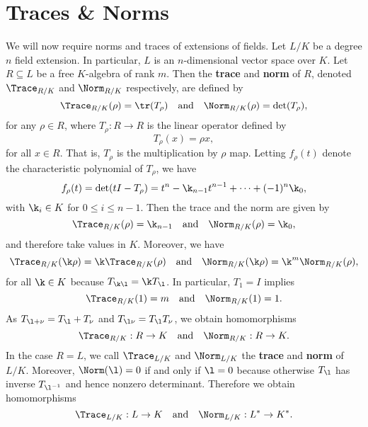   \section{Traces \& Norms}
    We will now require norms and traces of extensions of fields. Let $L/K$ be a degree $n$ field extension. In particular, $L$ is an $n$-dimensional vector space over $K$. Let $R \subseteq L$ be a free $K$-algebra of rank $m$. Then the \textbf{trace} and \textbf{norm} of $R$, denoted $\Trace_{R/K}$ and $\Norm_{R/K}$ respectively, are defined by
    \[
      \Trace_{R/K}(\rho) = \tr(T_{\rho}) \quad \text{and} \quad \Norm_{R/K}(\rho) = \det(T_{\rho}),
    \]
    for any $\rho \in R$, where $T_{\rho}:R \to R$ is the linear operator defined by
    \[
      T_{\rho}(x) = \rho x,
    \]
    for all $x \in R$. That is, $T_{\rho}$ is the multiplication by $\rho$ map. Letting $f_{\rho}(t)$ denote the characteristic polynomial of $T_{\rho}$, we have
    \[
      f_{\rho}(t) = \det(tI-T_{\rho}) = t^{n}-\k_{n-1}t^{n-1}+\cdots+(-1)^{n}\k_{0},
    \]
    with $\k_{i} \in K$ for $0 \le i \le n-1$. Then the trace and the norm are given by
    \begin{equation}\label{equ:trace_and_norm_characteristic_polynomial}
      \Trace_{R/K}(\rho) = \k_{n-1} \quad \text{and} \quad \Norm_{R/K}(\rho) = \k_{0},
    \end{equation}
    and therefore take values in $K$. Moreover, we have
    \[
      \Trace_{R/K}(\k\rho) = \k\Trace_{R/K}(\rho) \quad \text{and} \quad \Norm_{R/K}(\k\rho) = \k^{m}\Norm_{R/K}(\rho),
    \]
    for all $\k \in K$ because $T_{\k\l} = \k T_{\l}$. In particular, $T_{1} = I$ implies
    \[
      \Trace_{R/K}(1) = m \quad \text{and} \quad \Norm_{R/K}(1) = 1.
    \]
    As $T_{\l+\nu} = T_{\l}+T_{\nu}$ and $T_{\l \nu} = T_{\l}T_{\nu}$, we obtain homomorphisms
    \[
      \Trace_{R/K}:R \to K \quad \text{and} \quad \Norm_{R/K}:R \to K.
    \]
    In the case $R = L$, we call $\Trace_{L/K}$ and $\Norm_{L/K}$ the \textbf{trace} and \textbf{norm} of $L/K$. Moreover, $\Norm(\l) = 0$ if and only if $\l = 0$ because otherwise $T_{\l}$ has inverse $T_{\l^{-1}}$ and hence nonzero determinant. Therefore we obtain homomorphisms
    \[
      \Trace_{L/K}:L \to K \quad \text{and} \quad \Norm_{L/K}:L^{\ast} \to K^{\ast}.
    \]
